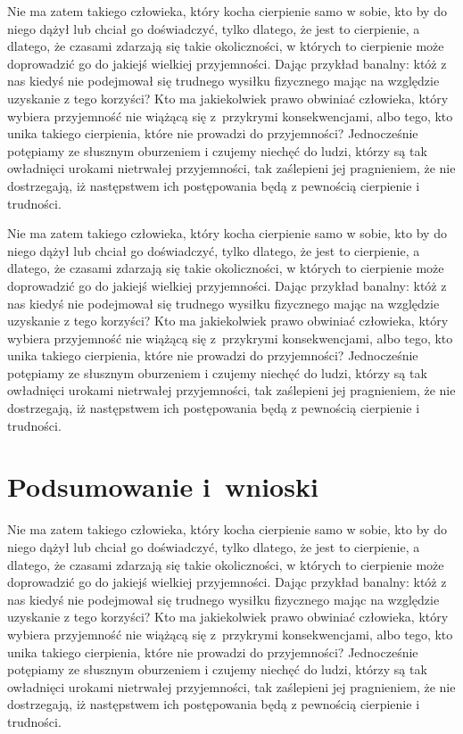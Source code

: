 \documentclass[12pt]{mwbk}
\theoremstyle{plain}
\theoremstyle{definition}
\theoremstyle{remark}
\begin{document}
Nie ma zatem takiego człowieka, który kocha cierpienie samo w sobie, 
kto by do niego dążył lub chciał go doświadczyć, tylko dlatego, że
jest to cierpienie, a dlatego, że czasami zdarzają się takie 
okoliczności, w których to cierpienie może doprowadzić 
go do jakiejś wielkiej przyjemności. 
Dając przykład banalny: któż z nas kiedyś nie podejmował 
się trudnego wysiłku fizycznego mając na względzie 
uzyskanie z tego korzyści? 
Kto ma jakiekolwiek prawo obwiniać człowieka, 
który wybiera przyjemność nie wiążącą się z~przykrymi 
konsekwencjami, albo tego, kto unika takiego cierpienia, 
które nie prowadzi do przyjemności? 
Jednocześnie potępiamy ze słusznym oburzeniem i czujemy 
niechęć do ludzi, którzy są tak owładnięci urokami nietrwałej 
przyjemności, tak zaślepieni jej pragnieniem, 
że nie dostrzegają, iż następstwem ich 
postępowania będą z pewnością cierpienie i trudności.

Nie ma zatem takiego człowieka, który kocha cierpienie samo w sobie, 
kto by do niego dążył lub chciał go doświadczyć, tylko dlatego, że
jest to cierpienie, a dlatego, że czasami zdarzają się takie 
okoliczności, w których to cierpienie może doprowadzić 
go do jakiejś wielkiej przyjemności. 
Dając przykład banalny: któż z nas kiedyś nie podejmował 
się trudnego wysiłku fizycznego mając na względzie 
uzyskanie z tego korzyści? 
Kto ma jakiekolwiek prawo obwiniać człowieka, 
który wybiera przyjemność nie wiążącą się z~przykrymi 
konsekwencjami, albo tego, kto unika takiego cierpienia, 
które nie prowadzi do przyjemności? 
Jednocześnie potępiamy ze słusznym oburzeniem i czujemy 
niechęć do ludzi, którzy są tak owładnięci urokami nietrwałej 
przyjemności, tak zaślepieni jej pragnieniem, 
że nie dostrzegają, iż następstwem ich 
postępowania będą z pewnością cierpienie i trudności.



\chapter*{Podsumowanie i~wnioski}

Nie ma zatem takiego człowieka, który kocha cierpienie samo w sobie, 
kto by do niego dążył lub chciał go doświadczyć, tylko dlatego, że
jest to cierpienie, a dlatego, że czasami zdarzają się takie 
okoliczności, w których to cierpienie może doprowadzić 
go do jakiejś wielkiej przyjemności. 
Dając przykład banalny: któż z nas kiedyś nie podejmował 
się trudnego wysiłku fizycznego mając na względzie 
uzyskanie z tego korzyści? 
Kto ma jakiekolwiek prawo obwiniać człowieka, 
który wybiera przyjemność nie wiążącą się z~przykrymi 
konsekwencjami, albo tego, kto unika takiego cierpienia, 
które nie prowadzi do przyjemności? 
Jednocześnie potępiamy ze słusznym oburzeniem i czujemy 
niechęć do ludzi, którzy są tak owładnięci urokami nietrwałej 
przyjemności, tak zaślepieni jej pragnieniem, 
że nie dostrzegają, iż następstwem ich 
postępowania będą z pewnością cierpienie i trudności.
\end{document}
